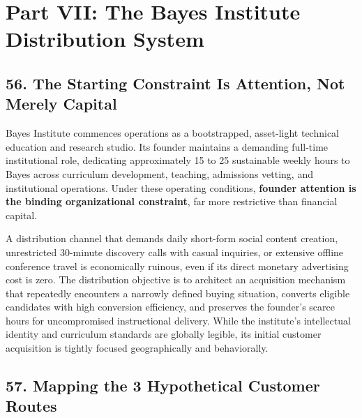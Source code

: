 \section*{Part VII: The Bayes Institute Distribution System}

\subsection*{56. The Starting Constraint Is Attention, Not Merely Capital}

Bayes Institute commences operations as a bootstrapped, asset-light technical education and research studio. Its founder maintains a demanding full-time institutional role, dedicating approximately 15 to 25 sustainable weekly hours to Bayes across curriculum development, teaching, admissions vetting, and institutional operations. Under these operating conditions, \textbf{founder attention is the binding organizational constraint}, far more restrictive than financial capital.

A distribution channel that demands daily short-form social content creation, unrestricted 30-minute discovery calls with casual inquiries, or extensive offline conference travel is economically ruinous, even if its direct monetary advertising cost is zero. The distribution objective is to architect an acquisition mechanism that repeatedly encounters a narrowly defined buying situation, converts eligible candidates with high conversion efficiency, and preserves the founder's scarce hours for uncompromised instructional delivery. While the institute's intellectual identity and curriculum standards are globally legible, its initial customer acquisition is tightly focused geographically and behaviorally.

\subsection*{57. Mapping the 3 Hypothetical Customer Routes}

